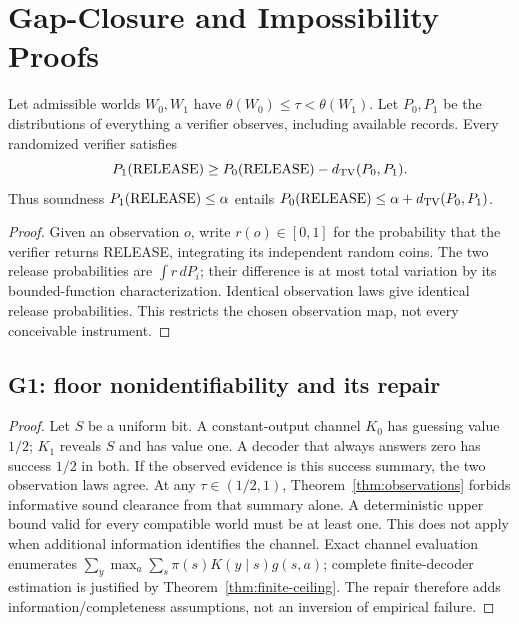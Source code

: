 \section{Gap-Closure and Impossibility Proofs}
\label{app:gaps}
\begin{theorem}
\label{thm:observations}
Let admissible worlds $W_0,W_1$ have
$\theta(W_0)\le\tau<\theta(W_1)$. Let $P_0,P_1$ be the distributions of
everything a verifier observes, including available records. Every randomized
verifier satisfies
\[
 P_1(\mathrm{RELEASE})\ge P_0(\mathrm{RELEASE})-d_{\rm TV}(P_0,P_1).
\]
Thus soundness $P_1(\mathrm{RELEASE})\le\alpha$ entails
$P_0(\mathrm{RELEASE})\le\alpha+d_{\rm TV}(P_0,P_1)$.
\end{theorem}
\begin{proof}
Given an observation $o$, write $r(o)\in[0,1]$ for the probability that the
verifier returns RELEASE, integrating its independent random coins.
The two release probabilities are $\int r\,dP_i$; their difference is at
most total variation by its bounded-function characterization. Identical
observation laws give identical release probabilities.
This restricts the chosen observation map, not every conceivable instrument.
\end{proof}

\subsection{G1: floor nonidentifiability and its repair}
\begin{proof}
Let $S$ be a uniform bit. A constant-output channel $K_0$ has guessing value
$1/2$; $K_1$ reveals $S$ and has value one. A decoder that always answers zero
has success $1/2$ in both. If the observed evidence is this success summary,
the two observation laws agree. At any $\tau\in(1/2,1)$,
Theorem~\ref{thm:observations} forbids informative sound clearance from that
summary alone. A deterministic upper bound valid for every compatible
world must be at least one. This does not apply when additional information
identifies the channel. Exact channel evaluation enumerates
$\sum_y\max_a\sum_s\pi(s)K(y\mid s)g(s,a)$; complete finite-decoder estimation
is justified by Theorem~\ref{thm:finite-ceiling}. The repair therefore adds
information/completeness assumptions, not an inversion of empirical failure.
\end{proof}

